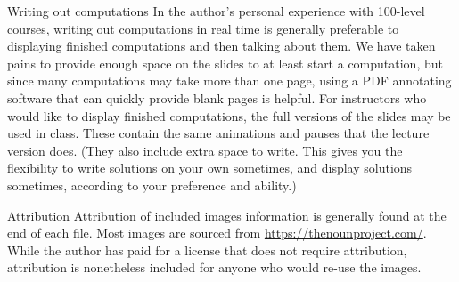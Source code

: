 \documentclass[10pt]{beamer}
\begin{document}
\begin{frame}{Writing out computations}
In the author's personal experience with 100-level courses, writing out computations in real time is generally preferable to displaying finished computations and then talking about them. We have taken pains to provide enough space on the slides to at least start a computation, but since many computations may take more than one page, using a PDF annotating software that can quickly provide blank pages is helpful.
\vfill
For instructors who would like to display finished computations, the full versions of the slides may be used in class. These contain the same animations and pauses that the lecture version does. (They also include extra space to write. This gives you the flexibility to write solutions on your own sometimes, and display solutions sometimes, according to your preference and ability.)
\end{frame}
\begin{frame}{Attribution}
Attribution of included images information is generally found at the end of each file. Most images are sourced from \url{https://thenounproject.com/}. While the author has paid for a license that does not require attribution, attribution is nonetheless included for anyone who would re-use the images.
\end{frame}

\end{document}
